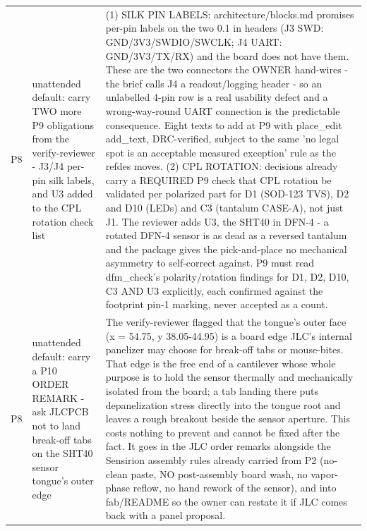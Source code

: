 \documentclass[11pt,a4paper]{article}
\begin{document}
{\begin{longtable}{lp{5.2cm}p{7.2cm}}
P8 & unattended default: carry TWO more P9 obligations from the verify-reviewer - J3/J4 per-pin silk labels, and U3 added to the CPL rotation check list & (1) SILK PIN LABELS: architecture/blocks.md promises per-pin labels on the two 0.1 in headers (J3 SWD: GND/3V3/SWDIO/SWCLK; J4 UART: GND/3V3/TX/RX) and the board does not have them. These are the two connectors the OWNER hand-wires - the brief calls J4 a readout/logging header - so an unlabelled 4-pin row is a real usability defect and a wrong-way-round UART connection is the predictable consequence. Eight texts to add at P9 with place\_edit add\_text, DRC-verified, subject to the same 'no legal spot is an acceptable measured exception' rule as the refdes moves. (2) CPL ROTATION: decisions already carry a REQUIRED P9 check that CPL rotation be validated per polarized part for D1 (SOD-123 TVS), D2 and D10 (LEDs) and C3 (tantalum CASE-A), not just J1. The reviewer adds U3, the SHT40 in DFN-4 - a rotated DFN-4 sensor is as dead as a reversed tantalum and the package gives the pick-and-place no mechanical asymmetry to self-correct against. P9 must read dfm\_check's polarity/rotation findings for D1, D2, D10, C3 AND U3 explicitly, each confirmed against the footprint pin-1 marking, never accepted as a count. \\
P8 & unattended default: carry a P10 ORDER REMARK - ask JLCPCB not to land break-off tabs on the SHT40 sensor tongue's outer edge & The verify-reviewer flagged that the tongue's outer face (x = 54.75, y 38.05-44.95) is a board edge JLC's internal panelizer may choose for break-off tabs or mouse-bites. That edge is the free end of a cantilever whose whole purpose is to hold the sensor thermally and mechanically isolated from the board; a tab landing there puts depanelization stress directly into the tongue root and leaves a rough breakout beside the sensor aperture. This costs nothing to prevent and cannot be fixed after the fact. It goes in the JLC order remarks alongside the Sensirion assembly rules already carried from P2 (no-clean paste, NO post-assembly board wash, no vapor-phase reflow, no hand rework of the sensor), and into fab/README so the owner can restate it if JLC comes back with a panel proposal. \\

\end{longtable}}
\end{document}
